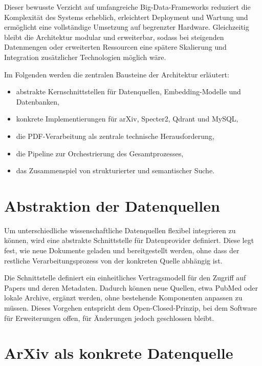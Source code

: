 Dieser bewusste Verzicht auf umfangreiche Big-Data-Frameworks reduziert die Komplexität des Systems erheblich, erleichtert Deployment und Wartung und ermöglicht eine vollständige Umsetzung auf begrenzter Hardware. Gleichzeitig bleibt die Architektur modular und erweiterbar, sodass bei steigenden Datenmengen oder erweiterten Ressourcen eine spätere Skalierung und Integration zusätzlicher Technologien möglich wäre.

Im Folgenden werden die zentralen Bausteine der Architektur erläutert:

\begin{itemize}
	\item abstrakte Kernschnittstellen für Datenquellen, Embedding-Modelle und Datenbanken,
	\item konkrete Implementierungen für arXiv, Specter2, Qdrant und MySQL,
	\item die PDF-Verarbeitung als zentrale technische Herausforderung,
	\item die Pipeline zur Orchestrierung des Gesamtprozesses,
	\item das Zusammenspiel von strukturierter und semantischer Suche.
\end{itemize}

\section{Abstraktion der Datenquellen}

Um unterschiedliche wissenschaftliche Datenquellen flexibel integrieren zu können, wird eine abstrakte Schnittstelle für Datenprovider definiert. Diese legt fest, wie neue Dokumente geladen und bereitgestellt werden, ohne dass der restliche Verarbeitungsprozess von der konkreten Quelle abhängig ist.



Die Schnittstelle definiert ein einheitliches Vertragsmodell für den Zugriff auf Papers und deren Metadaten. Dadurch können neue Quellen, etwa PubMed oder lokale Archive, ergänzt werden, ohne bestehende Komponenten anpassen zu müssen. Dieses Vorgehen entspricht dem Open-Closed-Prinzip, bei dem Software für Erweiterungen offen, für Änderungen jedoch geschlossen bleibt.

\section{ArXiv als konkrete Datenquelle}

